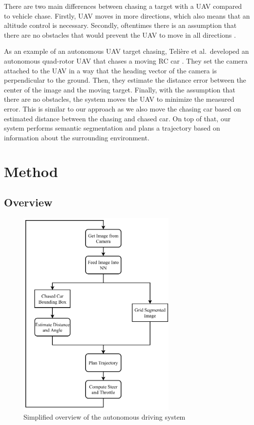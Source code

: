 \documentclass{ctuthesis/ctuthesis}
\begin{document}
There are two main differences between chasing a target with a UAV compared to vehicle chase. Firstly, UAV moves in more directions, which also means that an altitude control is necessary. Secondly, oftentimes there is an assumption that there are no obstacles that would prevent the UAV to move in all directions \cite{target_following_alg,uva_tracking_formula,rotorcraft}. \par


As an example of an autonomous UAV target chasing, Telière et al.\ developed an autonomous quad-rotor UAV that chases a moving RC car \cite{uva_tracking_formula}. They set the camera attached to the UAV in a way that the heading vector of the camera is perpendicular to the ground. Then, they estimate the distance error between the center of the image and the moving target. Finally, with the assumption that there are no obstacles, the system moves the UAV to minimize the measured error. This is similar to our approach as we also move the chasing car based on estimated distance between the chasing and chased car. On top of that, our system performs semantic segmentation and plans a trajectory based on information about the surrounding environment. 



\chapter{Method}\label{s:method}
\section{Overview}
\begin{figure}[]
    \centering
    \includegraphics[width=0.7\textwidth]{images/bachelor_diagram.pdf}
    \caption{Simplified overview of the autonomous driving system}\label{f:overview}
\end{figure}
\end{document}
